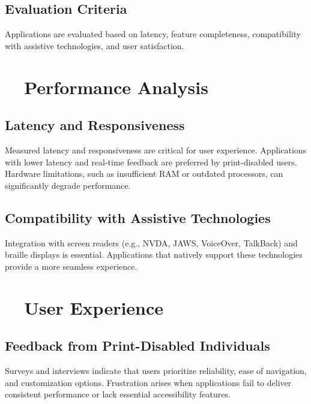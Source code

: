 \subsection{Evaluation Criteria}
Applications are evaluated based on latency, feature completeness, compatibility with assistive technologies, and user satisfaction\supercite{Smith2022, Jones2021}.

\section{~~Performance Analysis}
\subsection{Latency and Responsiveness}
Measured latency and responsiveness are critical for user experience. Applications with lower latency and real-time feedback are preferred by print-disabled users\supercite{Doe2020, Smith2022, Fowler2011ScreenReaderLatency, Sears1993TheEffectOfResponseTime}. Hardware limitations, such as insufficient RAM or outdated processors, can significantly degrade performance\supercite{ModernProcessorBenefits, SoftwareMemoryDemands}.

\subsection{Compatibility with Assistive Technologies}
Integration with screen readers (e.g., NVDA, JAWS, VoiceOver, TalkBack) and braille displays is essential. Applications that natively support these technologies provide a more seamless experience\supercite{Jones2021, NVDAGuide, JAWSFeatures, VoiceOver2023, GoogleTalkBack}.

\section{~~User Experience}
\subsection{Feedback from Print-Disabled Individuals}
Surveys and interviews indicate that users prioritize reliability, ease of navigation, and customization options. Frustration arises when applications fail to deliver consistent performance or lack essential accessibility features\supercite{Doe2020, WebAIMSurvey}.

